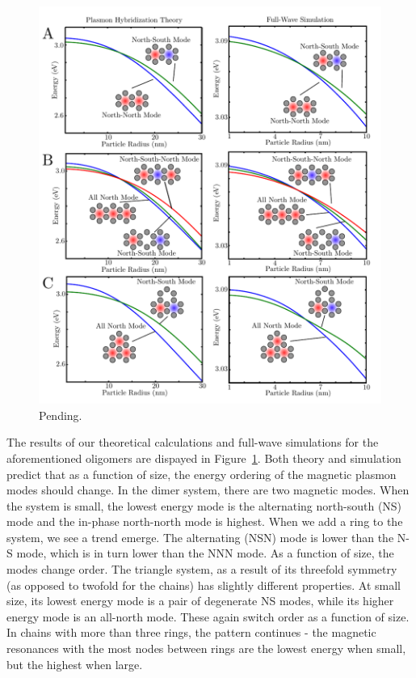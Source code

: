 \documentclass[journal=apchd5,manuscript=article]{achemso}
\begin{document}
\begin{figure}
\begin{center}
\includegraphics{theory_bem_comparison_fig1.pdf}
\caption{Pending.}
\label{theory_simul}
\end{center}
\end{figure}

The results of our theoretical calculations and full-wave simulations for the aforementioned oligomers are dispayed in Figure~\ref{theory_simul}. Both theory and simulation predict that as a function of size, the energy ordering of the magnetic plasmon modes should change. In the dimer system, there are two magnetic modes. When the system is small, the lowest energy mode is the alternating north-south (NS) mode and the in-phase north-north mode is highest. When we add a ring to the system, we see a trend emerge. The alternating (NSN) mode is lower than the N-S mode, which is in turn lower than the NNN mode. As a function of size, the modes change order. The triangle system, as a result of its threefold symmetry (as opposed to twofold for the chains) has slightly different properties. At small size, its lowest energy mode is a pair of degenerate NS modes, while its higher energy mode is an all-north mode. These again switch order as a function of size. In chains with more than three rings, the pattern continues - the magnetic resonances with the most nodes between rings are the lowest energy when small, but the highest when large.
\end{document}
